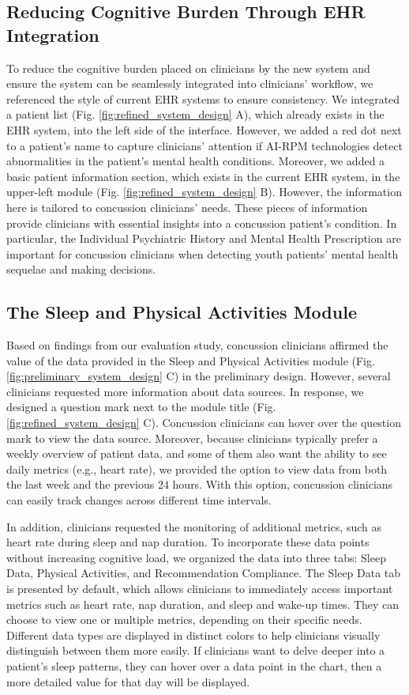 \subsection{Reducing Cognitive Burden Through EHR Integration}
To reduce the cognitive burden placed on clinicians by the new system and ensure the system can be seamlessly integrated into clinicians' workflow, we referenced the style of current EHR systems to ensure consistency. We integrated a patient list (Fig. \ref{fig:refined_system_design} A), which already exists in the EHR system, into the left side of the interface. However, we added a red dot next to a patient's name to capture clinicians' attention if AI-RPM technologies detect abnormalities in the patient's mental health conditions. Moreover, we added a basic patient information section, which exists in the current EHR system, in the upper-left module (Fig. \ref{fig:refined_system_design} B). However, the information here is tailored to concussion clinicians' needs. These pieces of information provide clinicians with essential insights into a concussion patient's condition. In particular, the Individual Psychiatric History and Mental Health Prescription are important for concussion clinicians when detecting youth patients’ mental health sequelae and making decisions.

\subsection{The Sleep and Physical Activities Module}
Based on findings from our evaluation study, concussion clinicians affirmed the value of the data provided in the Sleep and Physical Activities module (Fig. \ref{fig:preliminary_system_design} C) in the preliminary design. However, several clinicians requested more information about data sources. In response, we designed a question mark next to the module title (Fig. \ref{fig:refined_system_design} C).
Concussion clinicians can hover over the question mark to view the data source. 
Moreover, because clinicians typically prefer a weekly overview of patient data, and some of them also want the ability to see daily metrics (e.g., heart rate), we provided the option to view data from both the last week and the previous 24 hours. 
With this option, concussion clinicians can easily track changes across different time intervals.

In addition, clinicians requested the monitoring of additional metrics, such as heart rate during sleep and nap duration. To incorporate these data points without increasing cognitive load, we organized the data into three tabs: Sleep Data, Physical Activities, and Recommendation Compliance.
The Sleep Data tab is presented by default, which allows clinicians to immediately access important metrics such as heart rate, nap duration, and sleep and wake-up times.
They can choose to view one or multiple metrics, depending on their specific needs.
Different data types are displayed in distinct colors to help clinicians visually distinguish between them more easily. 
If clinicians want to delve deeper into a patient’s sleep patterns, they can hover over a data point in the chart, then a more detailed value for that day will be displayed.

